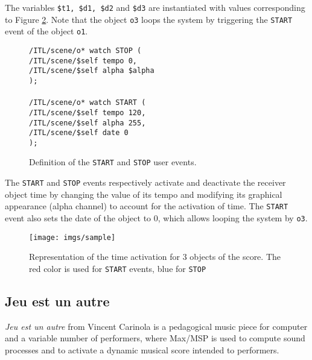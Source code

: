 \documentclass{article}
\newcommand{\OSC}[1]	{{\fontsize{8.5pt}{8pt} \selectfont\texttt{#1}}}
\newcommand{\tab}{\hspace*{4mm}}
\newcommand{\sample}[1]		{\vspace{-0.2em}\begin{center}\colorbox{mygrey}{\begin{minipage}[t]{0.98\columnwidth} {\small \texttt{#1}}\end{minipage}}\end{center}}
\begin{document}
The variables \OSC{\$t1, \$d1, \$d2} and \OSC{\$d3} are instantiated with values 
corresponding to Figure \ref{fig:sample}. Note that the object \OSC{o3} loops the system by triggering the \OSC{START} event of the object \OSC{o1}.

\begin{figure}[h]
   \centering
\sample{/ITL/scene/o* watch STOP ( \\
   \tab/ITL/scene/\$self tempo 0,\\
   \tab/ITL/scene/\$self alpha \$alpha	\\
);\\
\\
/ITL/scene/o* watch START ( \\
   \tab/ITL/scene/\$self tempo 120,\\
   \tab/ITL/scene/\$self alpha 255,\\
   \tab/ITL/scene/\$self date 0\\
);
}
   \caption{Definition of the \OSC{START} and \OSC{STOP} user events.}
   \label{fig:ex2}
\end{figure}

The \OSC{START} and \OSC{STOP} events respectively activate and deactivate the receiver object time by changing the value of its tempo and modifying its graphical appearance (alpha channel) to account for the activation of time. The \OSC{START} event also sets the date of the object to 0, which allows looping the system by \OSC{o3}.
\begin{figure}[h]
   \centering
   \texttt{[image: imgs/sample]}
   \caption{Representation of the time activation for 3 objects of the score. The red color is used for \OSC{START} events, blue for \OSC{STOP}}
   \label{fig:sample}
\end{figure}


\subsection{Jeu est un autre}

\emph{Jeu est un autre} from Vincent Carinola is a pedagogical music piece for computer and a variable number of performers, where Max/MSP is used to compute sound processes and to 
activate a dynamic musical score intended to performers. 
\end{document}
